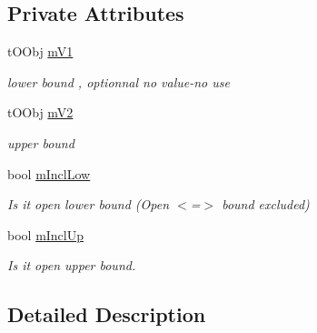 \subsection*{Private Attributes}
\begin{DoxyCompactItemize}
\item 
t\+O\+Obj \hyperlink{classMMVII_1_1cDataIntervSelector_ad397cd46405e1ec34a9072cbbf852d56}{m\+V1}\hypertarget{classMMVII_1_1cDataIntervSelector_ad397cd46405e1ec34a9072cbbf852d56}{}\label{classMMVII_1_1cDataIntervSelector_ad397cd46405e1ec34a9072cbbf852d56}

\begin{DoxyCompactList}\small\item\em lower bound , optionnal no value-\/no use \end{DoxyCompactList}\item 
t\+O\+Obj \hyperlink{classMMVII_1_1cDataIntervSelector_afda609e115e1998ff1c9c2ff08c1f5a9}{m\+V2}\hypertarget{classMMVII_1_1cDataIntervSelector_afda609e115e1998ff1c9c2ff08c1f5a9}{}\label{classMMVII_1_1cDataIntervSelector_afda609e115e1998ff1c9c2ff08c1f5a9}

\begin{DoxyCompactList}\small\item\em upper bound \end{DoxyCompactList}\item 
bool \hyperlink{classMMVII_1_1cDataIntervSelector_a936e68401ff6975187126a39491c1be1}{m\+Incl\+Low}\hypertarget{classMMVII_1_1cDataIntervSelector_a936e68401ff6975187126a39491c1be1}{}\label{classMMVII_1_1cDataIntervSelector_a936e68401ff6975187126a39491c1be1}

\begin{DoxyCompactList}\small\item\em Is it open lower bound (Open $<$=$>$ bound excluded) \end{DoxyCompactList}\item 
bool \hyperlink{classMMVII_1_1cDataIntervSelector_a9209e590782c07ab1586956edfba737a}{m\+Incl\+Up}\hypertarget{classMMVII_1_1cDataIntervSelector_a9209e590782c07ab1586956edfba737a}{}\label{classMMVII_1_1cDataIntervSelector_a9209e590782c07ab1586956edfba737a}

\begin{DoxyCompactList}\small\item\em Is it open upper bound. \end{DoxyCompactList}\end{DoxyCompactItemize}


\subsection{Detailed Description}

